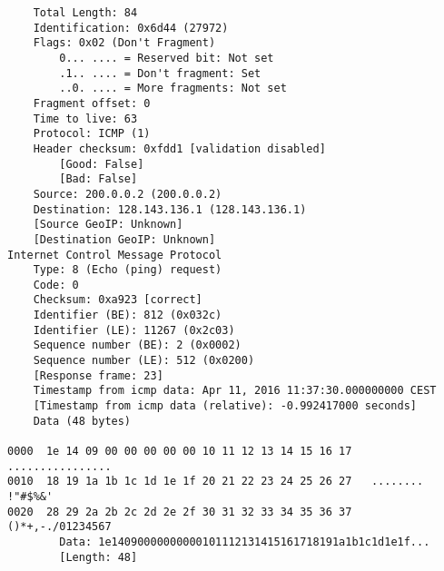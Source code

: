 \begin{lstlisting}
    Total Length: 84
    Identification: 0x6d44 (27972)
    Flags: 0x02 (Don't Fragment)
        0... .... = Reserved bit: Not set
        .1.. .... = Don't fragment: Set
        ..0. .... = More fragments: Not set
    Fragment offset: 0
    Time to live: 63
    Protocol: ICMP (1)
    Header checksum: 0xfdd1 [validation disabled]
        [Good: False]
        [Bad: False]
    Source: 200.0.0.2 (200.0.0.2)
    Destination: 128.143.136.1 (128.143.136.1)
    [Source GeoIP: Unknown]
    [Destination GeoIP: Unknown]
Internet Control Message Protocol
    Type: 8 (Echo (ping) request)
    Code: 0
    Checksum: 0xa923 [correct]
    Identifier (BE): 812 (0x032c)
    Identifier (LE): 11267 (0x2c03)
    Sequence number (BE): 2 (0x0002)
    Sequence number (LE): 512 (0x0200)
    [Response frame: 23]
    Timestamp from icmp data: Apr 11, 2016 11:37:30.000000000 CEST
    [Timestamp from icmp data (relative): -0.992417000 seconds]
    Data (48 bytes)

0000  1e 14 09 00 00 00 00 00 10 11 12 13 14 15 16 17   ................
0010  18 19 1a 1b 1c 1d 1e 1f 20 21 22 23 24 25 26 27   ........ !"#$%&'
0020  28 29 2a 2b 2c 2d 2e 2f 30 31 32 33 34 35 36 37   ()*+,-./01234567
        Data: 1e14090000000000101112131415161718191a1b1c1d1e1f...
        [Length: 48]
\end{lstlisting}


